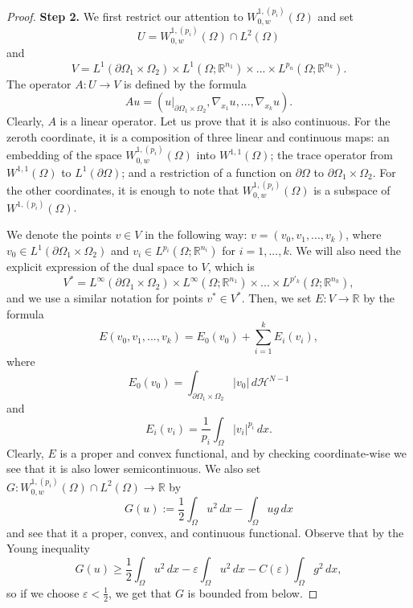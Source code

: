 \documentclass[reqno,12pt]{amsart}
\def\R{\mathbb R}
\numberwithin{equation}{section}
\begin{document}
\begin{proof}
{\flushleft \bf Step 2.} We first restrict our attention to $W_{0,w}^{1,(p_i)}(\Omega)$ and set 
$$U = W_{0,w}^{1,(p_i)}(\Omega) \cap L^2(\Omega)$$ 
and 
$$V = L^1(\partial\Omega_1 \times \Omega_2) \times L^1(\Omega; \mathbb{R}^{n_1}) \times ... \times L^{p_n}(\Omega; \mathbb{R}^{n_k}). $$
The operator $A: U \rightarrow V$ is defined by the formula
$$ Au = (u|_{\partial\Omega_1 \times \Omega_2}, \nabla_{x_1} u, ..., \nabla_{x_k} u).$$
Clearly, $A$ is a linear operator. Let us prove that it is also continuous. For the zeroth coordinate, it is a composition of three linear and continuous maps: an embedding of the space $W_{0,w}^{1,(p_i)}(\Omega)$ into $W^{1,1}(\Omega)$; the trace operator from $W^{1,1}(\Omega)$ to $L^1(\partial\Omega)$; and a restriction of a function on $\partial\Omega$ to $\partial\Omega_1 \times \Omega_2$. For the other coordinates, it is enough to note that $W_{0,w}^{1,(p_i)}(\Omega)$ is a subspace of $W^{1,(p_i)}(\Omega)$.

We denote the points $v \in V$ in the following way: $v = (v_0, v_1, ..., v_k)$, where $v_0 \in L^1(\partial\Omega_1 \times \Omega_2)$ and $v_i \in L^{p_i}(\Omega;\mathbb{R}^{n_i})$ for $i = 1,...,k$. We will also need the explicit expression of the dual space to $V$, which is
$$ V^* =  L^\infty(\partial\Omega_1 \times \Omega_2) \times L^\infty(\Omega;\mathbb{R}^{n_1}) \times ... \times L^{p'_k}(\Omega; \R^{n_k}),$$
and we use a similar notation for points $v^* \in V^*$. Then, we set $E: V \rightarrow \mathbb{R}$ by the formula
\begin{equation}
E(v_0,v_1,...,v_k) = E_0(v_0) + \sum_{i=1}^k E_i(v_i),
\end{equation}
where
\begin{equation}
E_0(v_0) = \int_{\partial\Omega_1 \times \Omega_2} \vert v_0 \vert \,d\mathcal{H}^{N-1}
\end{equation}
and
\begin{equation}
E_i(v_i) = \frac{1}{p_i} \int_\Omega |v_i|^{p_i} \, dx.
\end{equation}
Clearly, $E$ is a proper and convex functional, and by checking coordinate-wise we see that it is also lower semicontinuous. We also set $G: W_{0,w}^{1,(p_i)}(\Omega) \cap L^2(\Omega) \rightarrow \mathbb{R}$ by
$$G(u):= \frac12 \int_\Omega u^2 \, dx - \int_\Omega ug \, dx$$
and see that it a proper, convex, and continuous functional. Observe that by the Young inequality
\begin{equation}
G(u) \geq \frac12 \int_\Omega u^2 \, dx - \varepsilon \int_\Omega u^2 \, dx - C(\varepsilon) \int_\Omega g^2 \, dx,
\end{equation}
so if we choose $\varepsilon < \frac12$, we get that $G$ is bounded from below.


\end{proof}
\end{document}
